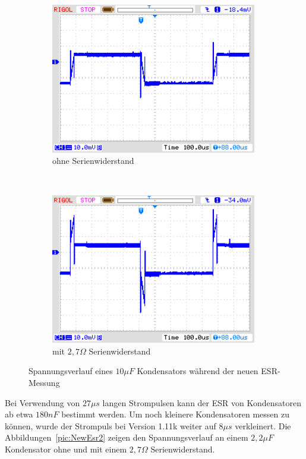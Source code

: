 \begin{figure}[H]
  \begin{subfigure}[b]{9cm}
    \centering
    \includegraphics[width=9cm]{../PNG/NewEsr10uF0R0.png}
    \caption{ohne Serienwiderstand}
  \end{subfigure}
  ~
  \begin{subfigure}[b]{9cm}
    \centering
    \includegraphics[width=9cm]{../PNG/NewEsr10uF2R7.png}
    \caption{mit \(2,7\Omega\) Serienwiderstand}
  \end{subfigure}
  \caption{Spannungsverlauf eines \(10\mu F\) Kondensators während der neuen ESR-Messung}
  \label{pic:NewEsr10}
\end{figure}

Bei Verwendung von \(27 \mu s\) langen Strompulsen kann der ESR von Kondensatoren ab etwa \(180 nF\) bestimmt werden.
Um noch kleinere Kondensatoren messen zu können, wurde der Strompuls bei Version 1.11k weiter auf \(8 \mu s\) verkleinert.
Die Abbildungen~\ref{pic:NewEsr2} zeigen den Spannungsverlauf an einem \(2,2 \mu F\) Kondensator ohne und mit
einem \(2,7 \Omega\) Serienwiderstand.

